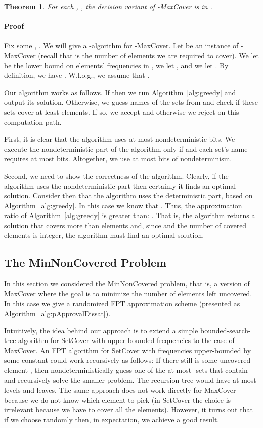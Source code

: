 \documentclass[11pt]{article}
\newtheorem{theorem}{Theorem}
\newenvironment{proof}{\paragraph{Proof}}{\hfill\medskip}
\begin{document}
\begin{theorem}
  For each , , the decision variant of
  -MaxCover is in .
\end{theorem}
\begin{proof}
  Fix some , .  We will give a
  -algorithm for -MaxCover. Let 
  be an instance of -MaxCover (recall that  is the number
  of elements we are required to cover). We let  be the lower bound
  on elements' frequencies in , we let , and we let
  . By definition, we have . W.l.o.g., we assume that .

  Our algorithm works as follows. If 
  then we run Algorithm~\ref{alg:greedy} and output its
  solution. Otherwise, we guess  names of the sets from  and
  check if these sets cover at least  elements. If so, we accept
  and otherwise we reject on this computation path. 
  
  First, it is clear that the algorithm uses at most 
  nondeterministic bits.  We execute the nondeterministic part of the
  algorithm only if  and each set's name requires at most  bits. Altogether, we use at most
   bits of nondeterminism.
 
  Second, we need to show the correctness of the algorithm. Clearly,
  if the algorithm uses the nondeterministic part then certainly it
  finds an optimal solution. Consider then that the algorithm uses the
  deterministic part, based on Algorithm~\ref{alg:greedy}.  In this
  case we know that . Thus, the
  approximation ratio of Algorithm~\ref{alg:greedy} is greater than:
  . That is,
  the algorithm returns a solution that covers more than
   elements and, since  and the
  number of covered elements is integer, the algorithm must find an
  optimal solution.
\end{proof}




\subsection{The MinNonCovered Problem}
In this section we considered the MinNonCovered problem, that is, a
version of MaxCover where the goal is to minimize the number of
elements left uncovered. In this case we give a randomized FPT
approximation scheme (presented as
Algorithm~\ref{alg:pApprovalDissat}).


Intuitively, the idea behind our approach is to extend a simple
bounded-search-tree algorithm for SetCover with upper-bounded
frequencies to the case of MaxCover. An FPT algorithm for SetCover
with frequencies upper-bounded by some constant  could work
recursively as follows: If there still is some uncovered element ,
then nondeterministically guess one of the at-most- sets that
contain  and recursively solve the smaller problem. The recursion
tree would have at most  levels and  leaves. The same approach
does not work directly for MaxCover because we do not know which
element  to pick (in SetCover the choice is irrelevant because we
have to cover all the elements). However, it turns out that if we
choose  randomly then, in expectation, we achieve a good result.
\end{document}
